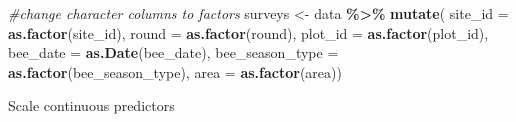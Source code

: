 \documentclass[
]{article}
\newenvironment{Shaded}{\begin{snugshade}}{\end{snugshade}}
\newcommand{\AttributeTok}[1]{\textcolor[rgb]{0.13,0.29,0.53}{#1}}
\newcommand{\CommentTok}[1]{\textcolor[rgb]{0.56,0.35,0.01}{\textit{#1}}}
\newcommand{\FunctionTok}[1]{\textcolor[rgb]{0.13,0.29,0.53}{\textbf{#1}}}
\newcommand{\NormalTok}[1]{#1}
\newcommand{\OtherTok}[1]{\textcolor[rgb]{0.56,0.35,0.01}{#1}}
\newcommand{\SpecialCharTok}[1]{\textcolor[rgb]{0.81,0.36,0.00}{\textbf{#1}}}
\begin{document}
\begin{Shaded}
\begin{Highlighting}[]
\CommentTok{\#change character columns to factors}
\NormalTok{surveys }\OtherTok{\textless{}{-}}\NormalTok{ data }\SpecialCharTok{\%\textgreater{}\%}
   \FunctionTok{mutate}\NormalTok{(}
     \AttributeTok{site\_id =} \FunctionTok{as.factor}\NormalTok{(site\_id),}
     \AttributeTok{round =} \FunctionTok{as.factor}\NormalTok{(round),}
     \AttributeTok{plot\_id =} \FunctionTok{as.factor}\NormalTok{(plot\_id),}
     \AttributeTok{bee\_date =} \FunctionTok{as.Date}\NormalTok{(bee\_date),}
     \AttributeTok{bee\_season\_type =} \FunctionTok{as.factor}\NormalTok{(bee\_season\_type),}
     \AttributeTok{area =} \FunctionTok{as.factor}\NormalTok{(area))}
\end{Highlighting}
\end{Shaded}

Scale continuous predictors
\end{document}
